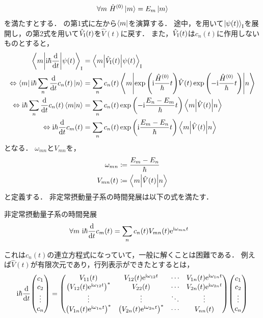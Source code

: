 \documentclass{report}
\begin{document}
  \begin{align}
    \forall m\ \hat{H}^{(0)}\ket{m} = E_m\ket{m}
  \end{align}
  を満たすとする．
  の第1式に左から$\bra{m}$を演算する．
  途中，を用いて$\ket{\psi(t)}_{\mathrm{I}}$を展開し，の第2式を用いて$\hat{V}_{\mathrm{I}}(t)$を$\hat{V}(t)$に戻す．
  また，$\hat{V}_{\mathrm{I}}(t)$は$c_n(t)$に作用しないものとすると，
  \begin{align}
    \mel**{m}{\mathrm{i}\hbar\dv{t}}{\psi(t)}_{\mathrm{I}} &= \mel**{m}{\hat{V}_{\mathrm{I}}(t)}{\psi(t)}_{\mathrm{I}} \\ 
    \Leftrightarrow \bra{m}\mathrm{i}\hbar\sum_{n}\dv{t}c_n(t)\ket{n} &= \sum_{n}c_n(t)\mel**{m}{\exp\qty(\mathrm{i}\frac{\hat{H}^{(0)}}{\hbar}t)\hat{V}(t)\exp\qty(-\mathrm{i}\frac{\hat{H}^{(0)}}{\hbar}t)}{n} \\ 
    \Leftrightarrow \mathrm{i}\hbar\sum_{n}\dv{t}c_n(t)\braket{m}{n} &= \sum_{n}c_n(t)\exp\qty(-\mathrm{i}\frac{E_n - E_m}{\hbar}t)\mel**{m}{\hat{V}(t)}{n} \\ 
    \Leftrightarrow \mathrm{i}\hbar \dv{t}c_m(t) &= \sum_{n}c_n(t)\exp\qty(\mathrm{i}\frac{E_m - E_n}{\hbar}t)\mel**{m}{\hat{V}(t)}{n}
  \end{align}
  となる．
  $\omega_{mn}$と$V_{mn}$を，
  \begin{align}
    \omega_{mn} &\coloneqq \frac{E_m - E_n}{\hbar} \\ 
    V_{mn}(t) &\coloneqq \mel**{m}{\hat{V}(t)}{n}
  \end{align}
  と定義する．
  非定常摂動量子系の時間発展は以下の式を満たす．
  \begin{itembox}[l]{非定常摂動量子系の時間発展}
    \begin{align}
      \forall m\ \mathrm{i}\hbar\dv{t}c_m(t) &= \sum_{n}c_n(t)V_{mn}(t)\mathrm{e}^{\mathrm{i}\omega_{mn}t}\label{cnt-eq}
    \end{align}
  \end{itembox}
  これは$c_n(t)$の連立方程式になっていて，一般に解くことは困難である．
  例えば$\hat{V}(t)$が有限次元であり，行列表示ができたとするとは，
  \begin{align}
    \i\hbar\dv{t}\mqty(c_1 \\ c_2 \\ \vdots \\ c_n) 
    = \mqty(
      V_{11}(t) & V_{12}(t)\e^{\i\omega_{12}t} & \cdots & V_{1n}(t)\e^{\i\omega_{1n}t} \\ 
      \qty(V_{12}(t)\e^{\i\omega_{12}t})^* & V_{22}(t) & \cdots & V_{2n}(t)\e^{\i\omega_{2n}t} \\ 
      \vdots & \vdots & \ddots & \vdots \\ 
      \qty(V_{1n}(t)\e^{\i\omega_{1n}t})^* & \qty(V_{2n}(t)\e^{\i\omega_{2n}t})^* & \cdots & V_{nn}(t)
      ) 
      \mqty(c_1 \\ c_2 \\ \vdots \\ c_n)\label{cnt-matrix}
  \end{align}
\end{document}
